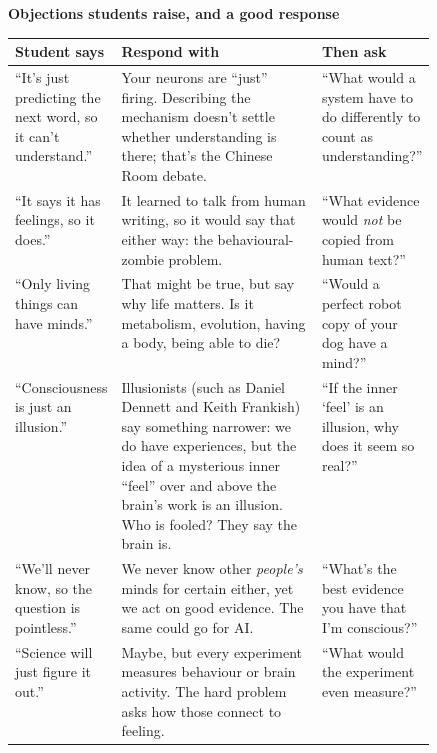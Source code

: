 \documentclass[11pt,letterpaper]{article}
\begin{document}
\textsf{\bfseries Objections students raise, and a good response}

{\small
\begin{tabularx}{\linewidth}{@{}>{\raggedright\arraybackslash}p{0.24\linewidth} >{\raggedright\arraybackslash}X >{\raggedright\arraybackslash}p{0.25\linewidth}@{}}
\toprule
\textsf{\textbf{Student says}} & \textsf{\textbf{Respond with}} & \textsf{\textbf{Then ask}}\\
\midrule
``It's just predicting the next word, so it can't understand.'' & Your neurons are ``just'' firing. Describing the mechanism doesn't settle whether understanding is there; that's the Chinese Room debate. & ``What would a system have to do differently to count as understanding?''\\\addlinespace
``It says it has feelings, so it does.'' & It learned to talk from human writing, so it would say that either way: the behavioural-zombie problem. & ``What evidence would \emph{not} be copied from human text?''\\\addlinespace
``Only living things can have minds.'' & That might be true, but say why life matters. Is it metabolism, evolution, having a body, being able to die? & ``Would a perfect robot copy of your dog have a mind?''\\\addlinespace
``Consciousness is just an illusion.'' & Illusionists (such as Daniel Dennett and Keith Frankish) say something narrower: we do have experiences, but the idea of a mysterious inner ``feel'' over and above the brain's work is an illusion. Who is fooled? They say the brain is. & ``If the inner `feel' is an illusion, why does it seem so real?''\\\addlinespace
``We'll never know, so the question is pointless.'' & We never know other \emph{people's} minds for certain either, yet we act on good evidence. The same could go for AI. & ``What's the best evidence you have that I'm conscious?''\\\addlinespace
``Science will just figure it out.'' & Maybe, but every experiment measures behaviour or brain activity. The hard problem asks how those connect to feeling. & ``What would the experiment even measure?''\\
\bottomrule
\end{tabularx}}
\end{document}

